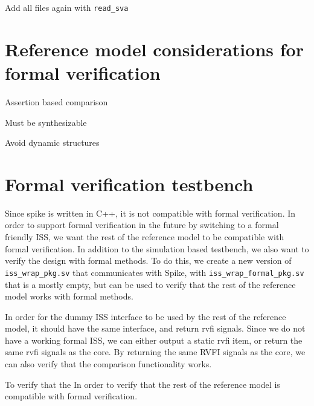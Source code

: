 Add all files again with \lstinline{read_sva}


\section{Reference model considerations for formal verification}

Assertion based comparison

Must be synthesizable

Avoid dynamic structures

\section{Formal verification testbench}

Since spike is written in C++, it is not compatible with formal verification. In order to support formal verification in the future by switching to a formal friendly ISS, we want the rest of the reference model to be compatible with formal verification. In addition to the simulation based testbench, we also want to verify the design with formal methods. To do this, we create a new version of \lstinline{iss_wrap_pkg.sv} that communicates with Spike, with \lstinline{iss_wrap_formal_pkg.sv} that is a mostly empty, but can be used to verify that the rest of the reference model works with formal methods.

In order for the dummy ISS interface to be used by the rest of the reference model, it should have the same interface, and return \acrshort{rvfi} signals. Since we do not have a working formal ISS, we can either output a static \acrshort{rvfi} item, or return the same \acrshort{rvfi} signals as the core. By returning the same RVFI signals as the core, we can also verify that the comparison functionality works.


To verify that the  In order to verify that the rest of the reference model is compatible with formal verification.

